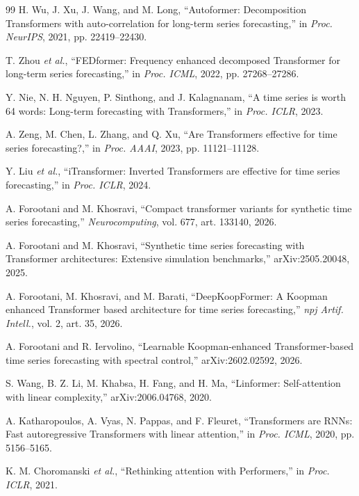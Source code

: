 \documentclass[journal]{IEEEtran}
\begin{document}
\begin{thebibliography}{99}
H. Wu, J. Xu, J. Wang, and M. Long, ``Autoformer: Decomposition Transformers with auto-correlation for long-term series forecasting,'' in \emph{Proc. NeurIPS}, 2021, pp. 22419--22430.

T. Zhou \emph{et al.}, ``FEDformer: Frequency enhanced decomposed Transformer for long-term series forecasting,'' in \emph{Proc. ICML}, 2022, pp. 27268--27286.

Y. Nie, N. H. Nguyen, P. Sinthong, and J. Kalagnanam, ``A time series is worth 64 words: Long-term forecasting with Transformers,'' in \emph{Proc. ICLR}, 2023.

A. Zeng, M. Chen, L. Zhang, and Q. Xu, ``Are Transformers effective for time series forecasting?,'' in \emph{Proc. AAAI}, 2023, pp. 11121--11128.

Y. Liu \emph{et al.}, ``iTransformer: Inverted Transformers are effective for time series forecasting,'' in \emph{Proc. ICLR}, 2024.

A. Forootani and M. Khosravi, ``Compact transformer variants for synthetic time series forecasting,'' \emph{Neurocomputing}, vol. 677, art. 133140, 2026.

A. Forootani and M. Khosravi, ``Synthetic time series forecasting with Transformer architectures: Extensive simulation benchmarks,'' arXiv:2505.20048, 2025.

A. Forootani, M. Khosravi, and M. Barati, ``DeepKoopFormer: A Koopman enhanced Transformer based architecture for time series forecasting,'' \emph{npj Artif. Intell.}, vol. 2, art. 35, 2026.

A. Forootani and R. Iervolino, ``Learnable Koopman-enhanced Transformer-based time series forecasting with spectral control,'' arXiv:2602.02592, 2026.

S. Wang, B. Z. Li, M. Khabsa, H. Fang, and H. Ma, ``Linformer: Self-attention with linear complexity,'' arXiv:2006.04768, 2020.

A. Katharopoulos, A. Vyas, N. Pappas, and F. Fleuret, ``Transformers are RNNs: Fast autoregressive Transformers with linear attention,'' in \emph{Proc. ICML}, 2020, pp. 5156--5165.

K. M. Choromanski \emph{et al.}, ``Rethinking attention with Performers,'' in \emph{Proc. ICLR}, 2021.

\end{thebibliography}
\end{document}
